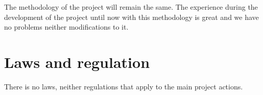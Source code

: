 The methodology of the project will remain the same. The experience during the development of the project until now with this methodology is great and we have no problems neither modifications to it. 

\section{Laws and regulation}

There is no laws, neither regulations that apply to the main project actions.

